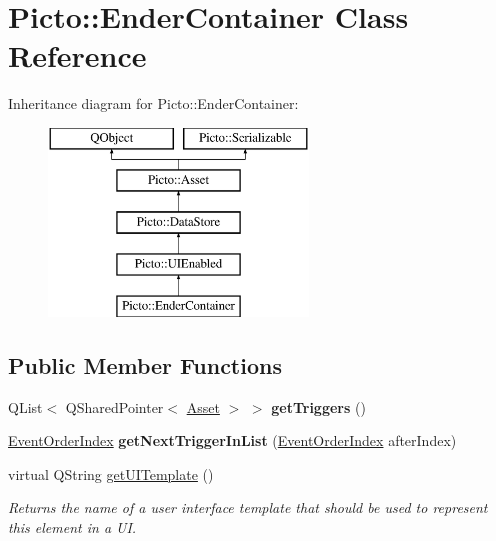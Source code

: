 \hypertarget{class_picto_1_1_ender_container}{\section{Picto\-:\-:Ender\-Container Class Reference}
\label{class_picto_1_1_ender_container}
}
Inheritance diagram for Picto\-:\-:Ender\-Container\-:\begin{figure}[H]
\begin{center}
\leavevmode
\includegraphics[height=5.000000cm]{class_picto_1_1_ender_container}
\end{center}
\end{figure}
\subsection*{Public Member Functions}
\begin{DoxyCompactItemize}
\item 
\hypertarget{class_picto_1_1_ender_container_a410096910e0436af5295a7f207b8bd6c}{Q\-List$<$ Q\-Shared\-Pointer$<$ \hyperlink{class_picto_1_1_asset}{Asset} $>$ $>$ {\bfseries get\-Triggers} ()}\label{class_picto_1_1_ender_container_a410096910e0436af5295a7f207b8bd6c}

\item 
\hypertarget{class_picto_1_1_ender_container_afe039803fc7d43a3b904e63ba8956842}{\hyperlink{class_picto_1_1_event_order_index}{Event\-Order\-Index} {\bfseries get\-Next\-Trigger\-In\-List} (\hyperlink{class_picto_1_1_event_order_index}{Event\-Order\-Index} after\-Index)}\label{class_picto_1_1_ender_container_afe039803fc7d43a3b904e63ba8956842}

\item 
\hypertarget{class_picto_1_1_ender_container_a18771418befe6f2e87c6171606e33184}{virtual Q\-String \hyperlink{class_picto_1_1_ender_container_a18771418befe6f2e87c6171606e33184}{get\-U\-I\-Template} ()}\label{class_picto_1_1_ender_container_a18771418befe6f2e87c6171606e33184}

\begin{DoxyCompactList}\small\item\em Returns the name of a user interface template that should be used to represent this element in a U\-I. \end{DoxyCompactList}\end{DoxyCompactItemize}
